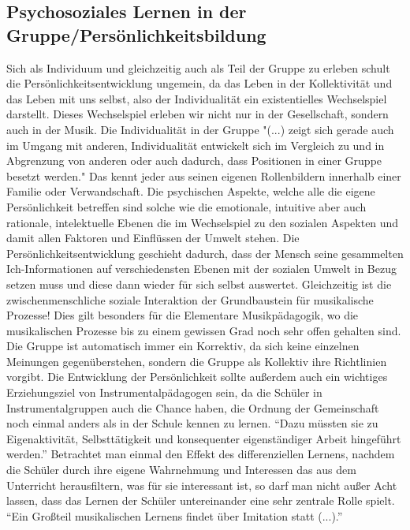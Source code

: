 \subsection{Psychosoziales Lernen in der Gruppe/Persönlichkeitsbildung}
Sich als Individuum und gleichzeitig auch als Teil der Gruppe zu erleben schult
die Persönlichkeitsentwicklung ungemein, da das Leben in der Kollektivität und
das Leben mit uns selbst, also der Individualität ein existentielles
Wechselspiel darstellt. Dieses Wechselspiel erleben wir nicht nur in der Gesellschaft,
sondern auch in der Musik. Die Individualität in der Gruppe 
"(...) zeigt sich gerade auch im Umgang mit anderen,
Individualität entwickelt sich im Vergleich zu und in Abgrenzung von anderen
oder auch dadurch, dass Positionen in einer Gruppe besetzt werden."
Das kennt jeder aus seinen eigenen Rollenbildern innerhalb einer Familie oder
Verwandschaft. Die psychischen Aspekte, welche alle die eigene Persönlichkeit
betreffen sind solche wie die emotionale, intuitive aber auch rationale,
intelektuelle Ebenen die im Wechselspiel zu den sozialen Aspekten
und damit allen Faktoren und Einflüssen der Umwelt stehen. Die
Persönlichkeitsentwicklung geschieht dadurch, dass der Mensch
seine gesammelten Ich-Informationen auf verschiedensten Ebenen mit der sozialen
Umwelt in Bezug setzen muss und diese dann wieder für sich selbst auswertet.
Gleichzeitig ist die zwischenmenschliche soziale
Interaktion der Grundbaustein für musikalische Prozesse! %
Dies gilt besonders für die Elementare Musikpädagogik, wo die musikalischen
Prozesse bis zu einem gewissen Grad noch sehr offen gehalten sind.
Die Gruppe ist automatisch immer ein Korrektiv, da sich keine einzelnen
Meinungen gegenüberstehen, sondern die Gruppe als Kollektiv ihre Richtlinien
vorgibt. 
Die Entwicklung der Persönlichkeit sollte außerdem auch ein wichtiges
Erziehungsziel von Instrumentalpädagogen sein, da die Schüler in
Instrumentalgruppen auch die Chance haben, die Ordnung der Gemeinschaft noch
einmal anders als in der Schule kennen
zu lernen. \enquote{Dazu müssten sie zu Eigenaktivität, Selbsttätigkeit und konsequenter
eigenständiger Arbeit hingeführt werden.}\autocite[64]{losert:die_kunst_zu_unterrichten}
Betrachtet man einmal den Effekt des differenziellen Lernens, nachdem die
Schüler durch ihre eigene Wahrnehmung und Interessen das aus dem Unterricht
herausfiltern, was für sie interessant ist, so darf man nicht außer Acht lassen,
dass das Lernen der Schüler untereinander eine sehr zentrale Rolle spielt. 
\enquote{Ein Großteil musikalischen Lernens findet über Imitation statt (...).}\autocite[98]{doerne:umfassend_musizieren}

